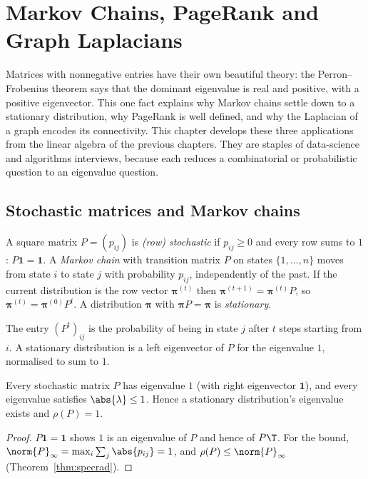 \chapter{Markov Chains, PageRank and Graph Laplacians}

Matrices with nonnegative entries have their own beautiful theory: the Perron--Frobenius theorem says that the dominant eigenvalue is real and positive, with a positive eigenvector. This one fact explains why Markov chains settle down to a stationary distribution, why PageRank is well defined, and why the Laplacian of a graph encodes its connectivity. This chapter develops these three applications from the linear algebra of the previous chapters. They are staples of data-science and algorithms interviews, because each reduces a combinatorial or probabilistic question to an eigenvalue question.

\section{Stochastic matrices and Markov chains}

\begin{definition}
A square matrix $P=(p_{ij})$ is \emph{(row) stochastic} if $p_{ij}\ge0$ and every row sums to $1$: $P\mathbf{1}=\mathbf{1}$. A \emph{Markov chain} with transition matrix $P$ on states $\{1,\dots,n\}$ moves from state $i$ to state $j$ with probability $p_{ij}$, independently of the past. If the current distribution is the row vector $\boldsymbol\pi^{(t)}$ then $\boldsymbol\pi^{(t+1)}=\boldsymbol\pi^{(t)}P$, so $\boldsymbol\pi^{(t)}=\boldsymbol\pi^{(0)}P^t$. A distribution $\boldsymbol\pi$ with $\boldsymbol\pi P=\boldsymbol\pi$ is \emph{stationary}.
\end{definition}

The entry $(P^t)_{ij}$ is the probability of being in state $j$ after $t$ steps starting from $i$. A stationary distribution is a left eigenvector of $P$ for the eigenvalue $1$, normalised to sum to $1$.

\begin{theorem}\label{thm:stochspec}
Every stochastic matrix $P$ has eigenvalue $1$ (with right eigenvector $\mathbf{1}$), and every eigenvalue satisfies $\abs{\lambda}\le1$. Hence a stationary distribution's eigenvalue exists and $\rho(P)=1$.
\end{theorem}

\begin{proof}
$P\mathbf{1}=\mathbf{1}$ shows $1$ is an eigenvalue of $P$ and hence of $P\T$. For the bound, $\norm{P}_\infty=\max_i\sum_j\abs{p_{ij}}=1$, and $\rho(P)\le\norm{P}_\infty$ (Theorem~\ref{thm:specrad}).
\end{proof}

